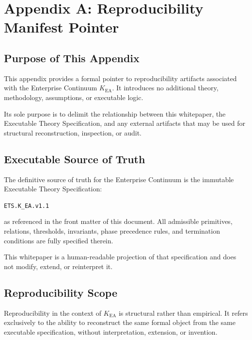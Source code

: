 
\section*{Appendix A: Reproducibility Manifest Pointer}

\subsection*{Purpose of This Appendix}

This appendix provides a formal pointer to reproducibility artifacts
associated with the Enterprise Continuum $K_{\mathrm{EA}}$.
It introduces no additional theory, methodology, assumptions, or
executable logic.

Its sole purpose is to delimit the relationship between this
whitepaper, the Executable Theory Specification, and any external
artifacts that may be used for structural reconstruction, inspection,
or audit.

\subsection*{Executable Source of Truth}

The definitive source of truth for the Enterprise Continuum is the
immutable Executable Theory Specification:

\begin{center}
\texttt{ETS.K\_EA.v1.1}
\end{center}

as referenced in the front matter of this document.
All admissible primitives, relations, thresholds, invariants, phase
precedence rules, and termination conditions are fully specified
therein.

This whitepaper is a human-readable projection of that specification
and does not modify, extend, or reinterpret it.

\subsection*{Reproducibility Scope}

Reproducibility in the context of $K_{\mathrm{EA}}$ is structural rather
than empirical.
It refers exclusively to the ability to reconstruct the same formal
object from the same executable specification, without interpretation,
extension, or invention.

